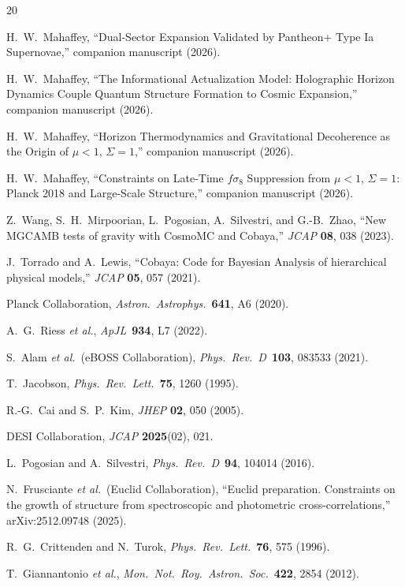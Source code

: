 \documentclass[11pt,letterpaper]{article}
\begin{document}
\begin{thebibliography}{20}

H.~W.~Mahaffey, ``Dual-Sector Expansion Validated by Pantheon+ Type Ia Supernovae,'' companion manuscript (2026).

H.~W.~Mahaffey, ``The Informational Actualization Model: Holographic Horizon Dynamics Couple Quantum Structure Formation to Cosmic Expansion,'' companion manuscript (2026).

H.~W.~Mahaffey, ``Horizon Thermodynamics and Gravitational Decoherence as the Origin of $\mu < 1$, $\Sigma = 1$,'' companion manuscript (2026).

H.~W.~Mahaffey, ``Constraints on Late-Time $f\sigma_8$ Suppression from $\mu < 1$, $\Sigma = 1$: Planck 2018 and Large-Scale Structure,'' companion manuscript (2026).

Z.~Wang, S.~H.~Mirpoorian, L.~Pogosian, A.~Silvestri, and G.-B.~Zhao, ``New MGCAMB tests of gravity with CosmoMC and Cobaya,'' \textit{JCAP} \textbf{08}, 038 (2023).

J.~Torrado and A.~Lewis, ``Cobaya: Code for Bayesian Analysis of hierarchical physical models,'' \textit{JCAP} \textbf{05}, 057 (2021).

Planck Collaboration, \textit{Astron.\ Astrophys.}\ \textbf{641}, A6 (2020).

A.~G.~Riess \textit{et al.}, \textit{ApJL}\ \textbf{934}, L7 (2022).

S.~Alam \textit{et al.}\ (eBOSS Collaboration), \textit{Phys.\ Rev.\ D}\ \textbf{103}, 083533 (2021).

T.~Jacobson, \textit{Phys.\ Rev.\ Lett.}\ \textbf{75}, 1260 (1995).

R.-G.~Cai and S.~P.~Kim, \textit{JHEP} \textbf{02}, 050 (2005).

DESI Collaboration, \textit{JCAP} \textbf{2025}(02), 021.

L.~Pogosian and A.~Silvestri, \textit{Phys.\ Rev.\ D}\ \textbf{94}, 104014 (2016).

N.~Frusciante \textit{et al.}\ (Euclid Collaboration), ``Euclid preparation. Constraints on the growth of structure from spectroscopic and photometric cross-correlations,'' arXiv:2512.09748 (2025).

R.~G.~Crittenden and N.~Turok, \textit{Phys.\ Rev.\ Lett.}\ \textbf{76}, 575 (1996).

T.~Giannantonio \textit{et al.}, \textit{Mon.\ Not.\ Roy.\ Astron.\ Soc.}\ \textbf{422}, 2854 (2012).

\end{thebibliography}
\end{document}
